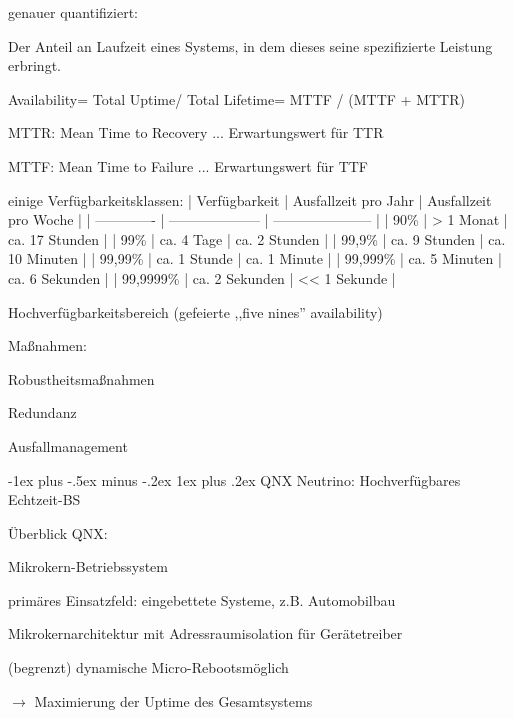 \documentclass[a4paper]{article}
\makeatletter
\renewcommand{\subsubsection}{\@startsection{subsubsection}{3}{0mm}%
 {-1ex plus -.5ex minus -.2ex}%
 {1ex plus .2ex}%
 {\normalfont\small\bfseries}}
\makeatother
\begin{document}
\begin{multicols}{3}
    genauer quantifiziert:

    \begin{itemize*}
        \item
        Der Anteil an Laufzeit eines Systems, in dem dieses seine
        spezifizierte Leistung erbringt.
        \item
        \item
        Availability= Total Uptime/ Total Lifetime= MTTF / (MTTF + MTTR)
        \begin{itemize*}
            \item MTTR: Mean Time to Recovery ... Erwartungswert für TTR
            \item MTTF: Mean Time to Failure ... Erwartungswert für TTF
        \end{itemize*}
        \item
        einige Verfügbarkeitsklassen: | Verfügbarkeit |
        Ausfallzeit pro Jahr | Ausfallzeit pro Woche |
        | ------------- |
        -------------------- |
        ---------------------
        | | 90\% | \textgreater{} 1 Monat
        | ca. 17 Stunden | | 99\% | ca. 4
        Tage | ca. 2 Stunden | | 99,9\% |
        ca. 9 Stunden | ca. 10 Minuten | | 99,99\%
        | ca. 1 Stunde | ca. 1 Minute | |
        99,999\% | ca. 5 Minuten | ca. 6 Sekunden |
        | 99,9999\% | ca. 2 Sekunden |
        \textless\textless{} 1 Sekunde |
        \item
        Hochverfügbarkeitsbereich (gefeierte ,,five nines'' availability)
        \item
        Maßnahmen:
        \item
        Robustheitsmaßnahmen
        \item
        Redundanz
        \item
        Ausfallmanagement
    \end{itemize*}


    \subsubsection{QNX Neutrino: Hochverfügbares
        Echtzeit-BS}

    Überblick QNX:

    \begin{itemize*}
        \item
        Mikrokern-Betriebssystem
        \item
        primäres Einsatzfeld: eingebettete Systeme, z.B. Automobilbau
        \item
        Mikrokernarchitektur mit Adressraumisolation für Gerätetreiber
        \item
        (begrenzt) dynamische Micro-Rebootsmöglich
        \item
        $\rightarrow$ Maximierung der Uptime des Gesamtsystems
    \end{itemize*}


\end{multicols}
\end{document}
